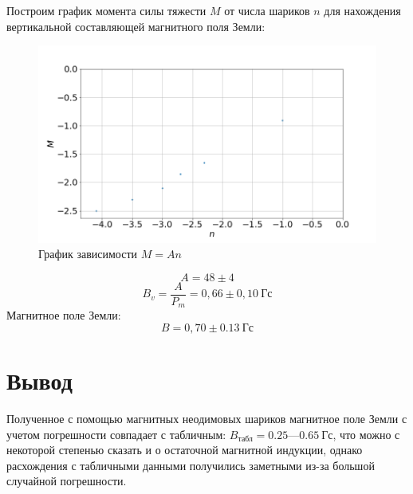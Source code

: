 \documentclass[a4paper, fontsize=14pt]{article}
\begin{document}
Построим график момента силы тяжести $M$ от числа шариков $n$ для нахождения вертикальной составляющей магнитного поля Земли:
\begin{figure}[H]
	\includegraphics[width = 1.0\linewidth]{3.png}
	\caption{График зависимости $M = An$}
	\end{figure}
\[
	A = 48 \pm 4
\]
\[
	B_v = \frac{A}{P_m} = 0,66 \pm 0,10\ \text{Гс}
\]
Магнитное поле Земли:
\[
	B = 0,70 \pm 0.13\ \text{Гс}
\]
\section*{Вывод}
Полученное с помощью магнитных неодимовых шариков магнитное поле Земли с учетом погрешности совпадает с табличным: $B_\text{табл} = 0.25 \text{---} 0.65\ \text{Гс}$, что можно с некоторой степенью сказать и о остаточной магнитной индукции, однако расхождения с табличными данными получились заметными из-за большой случайной погрешности.
\end{document}
